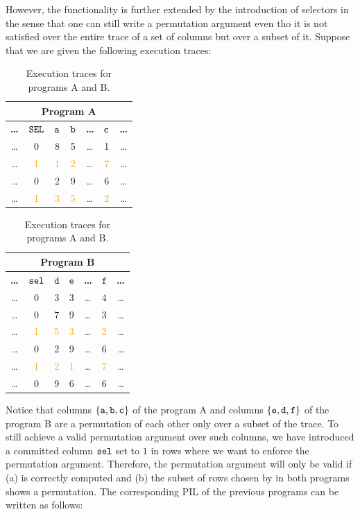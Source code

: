 However, the functionality is further extended by the introduction of selectors in the sense that one can still write a permutation argument even tho it is not satisfied over the entire trace of a set of columns but over a subset of it. Suppose that we are given the following execution traces:
\begin{table}[H]
    \centering
    \begin{tabular}{|c|c|c|c|c|c|c|}
        \hline
        \multicolumn{7}{|c|}{\textbf{Program A}} \\
        \hline
        \textbf{\dots} &$\mathtt{SEL}$	&$\mathtt{a}$	&$\mathtt{b}$	&\textbf{\dots}	&$\mathtt{c}$	&\textbf{\dots}	\\ \hline
        \dots	&0	&8	&5	&\dots	&1	&\dots \\
        \dots	&\textcolor{orange}{1}	&\textcolor{orange}{1}	&\textcolor{orange}{2}	&\dots	&\textcolor{orange}{7}	&\dots \\
        \dots	&0	&2	&9	&\dots	&6	&\dots \\
        \dots	&\textcolor{orange}{1}	&\textcolor{orange}{3}	&\textcolor{orange}{5}	&\dots	&\textcolor{orange}{2}	&\dots \\
        \hline
    \end{tabular}
    \begin{tabular}{|c|c|c|c|c|c|c|}
        \hline
        \multicolumn{7}{|c|}{\textbf{Program B}} \\
        \hline
        \textbf{\dots} &$\mathtt{sel}$	&$\mathtt{d}$	&$\mathtt{e}$	&\textbf{\dots}	&$\mathtt{f}$	&\textbf{\dots}	\\ \hline
        \dots	&0	&3	&3	&\dots	&4	&\dots \\
        \dots	&0	&7	&9	&\dots	&3	&\dots \\
        \dots	&\textcolor{orange}{1}	&\textcolor{orange}{5}	&\textcolor{orange}{3}	&\dots	&\textcolor{orange}{2}	&\dots \\
        \dots	&0	&2	&9	&\dots	&6	&\dots \\
        \dots	&\textcolor{orange}{1}	&\textcolor{orange}{2}	&\textcolor{orange}{1}	&\dots	&\textcolor{orange}{7}	&\dots \\
        \dots	&0	&9	&6	&\dots	&6	&\dots \\
        \hline
    \end{tabular}
    \caption{Execution traces for programs \textsf{A} and \textsf{B}. }
    \label{table:permutation-args-B}
\end{table}
Notice that columns $\{\mathtt{a},\mathtt{b},\mathtt{c}\}$ of the program \textsf{A} and columns $\{\mathtt{e},\mathtt{d},\mathtt{f}\}$ of the program \textsf{B} are a permutation of each other only over a subset of the trace. To still achieve a valid permutation argument over such columns, we have introduced a committed column $\mathtt{sel}$ set to $1$ in rows where we want to enforce the permutation argument. Therefore, the permutation argument will only be valid if (a) \sel is correctly computed and (b) the subset of rows chosen by \sel in both programs shows a permutation. The corresponding PIL of the previous programs can be written as follows:
